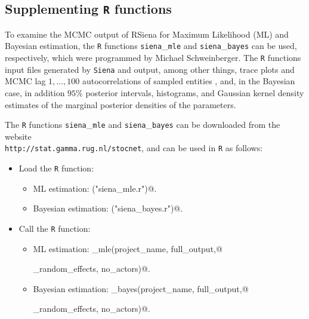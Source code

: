 \documentclass[a4paper,fleqn,11pt]{article}
\newcommand{\+}{\, + \,}
\newcommand{\RS}{{\sf \textsf{RSiena} }}
\begin{document}
\subsection{Supplementing {\tt R} functions}
\label{R_functions}

To examine the MCMC output of \RS for Maximum Likelihood (ML) and Bayesian estimation,
the {\tt R} functions {\tt siena}\_{\tt mle} and {\tt siena}\_{\tt bayes} can be used,
respectively,
which were programmed by Michael Schweinberger.
The {\tt R} functions input files generated by {\tt Siena} and output,
among other things,
trace plots and MCMC lag $1, \dots, 100$ autocorrelations of sampled entities
\citep[see][]{SchweinbergerSnijders07b, SchweinbergerSnijders07c},
and,
in the Bayesian case,
in addition $95\%$ posterior intervals, histograms, and Gaussian kernel density
estimates of the marginal posterior densities of the parameters.

The {\tt R} functions {\tt siena}\_{\tt mle} and {\tt siena}\_{\tt bayes}
can be downloaded from the website \\
{\tt http://stat.gamma.rug.nl/stocnet},
and can be used in {\tt R} as follows:

\begin{itemize}
\item[(1)] Load the {\tt R} function:
\begin{itemize}
\item[---] ML estimation: \verb@source("siena_mle.r")@.
\item[---] Bayesian estimation: \verb@source("siena_bayes.r")@.
\end{itemize}
\item[(2)] Call the {\tt R} function:
\begin{itemize}
\item[---] ML estimation: \verb@siena_mle(project_name, full_output,@

\verb@no_random_effects, no_actors)@.

\item[---] Bayesian estimation: \verb@siena_bayes(project_name, full_output,@

\verb@no_random_effects, no_actors)@.

\end{itemize}
\end{itemize}
\end{document}
